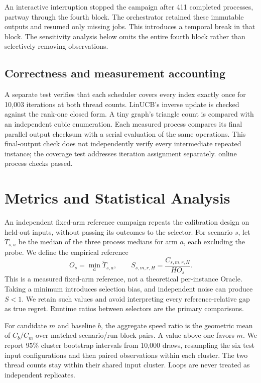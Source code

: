 \documentclass[10pt,letterpaper]{article}
\begin{document}
An interactive interruption stopped the campaign after 411 completed processes,
partway through the fourth block. The orchestrator retained these immutable
outputs and resumed only missing jobs. This introduces a temporal break in
that block. The sensitivity analysis below omits the entire fourth block
rather than selectively removing observations.

\subsection{Correctness and measurement accounting}

A separate test verifies that each scheduler covers every index exactly once
for 10,003 iterations at both thread counts. LinUCB's inverse update is checked
against the rank-one closed form. A tiny graph's triangle count is compared
with an independent cubic enumeration. Each measured process compares its
final parallel output checksum with a serial evaluation of the same
operations. This final-output check does not independently verify every
intermediate repeated instance; the coverage test addresses iteration
assignment separately. \CorrectRuns{} online process checks passed.

\section{Metrics and Statistical Analysis}

An independent fixed-arm reference campaign repeats the calibration design on
held-out inputs, without passing its outcomes to the selector. For scenario
$s$, let $\widetilde T_{s,a}$ be the median of the three process medians for arm
$a$, each excluding the probe. We define the empirical reference
\begin{equation}
 O_s=\min_a\widetilde T_{s,a},\qquad
 S_{s,m,r,H}=\frac{C_{s,m,r,H}}{H O_s}.
 \label{eq:reference}
\end{equation}
This is a measured fixed-arm reference, not a theoretical per-instance Oracle.
Taking a minimum introduces selection bias, and independent noise can produce
$S<1$. We retain such values and avoid interpreting every reference-relative
gap as true regret. Runtime ratios between selectors are the primary
comparisons.

For candidate $m$ and baseline $b$, the aggregate speed ratio is the geometric
mean of $C_b/C_m$ over matched scenario/run-block pairs. A value above one
favors $m$. We report 95\% cluster bootstrap intervals from 10,000 draws,
resampling the six test input configurations and then paired observations
within each cluster. The two thread counts stay within their shared input
cluster. Loops are never treated as independent replicates.
\end{document}
